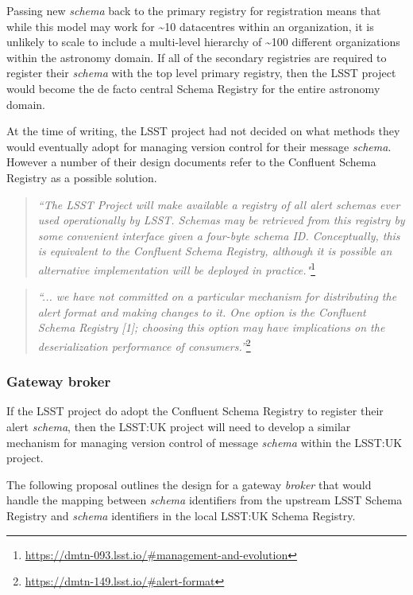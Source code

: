 \documentclass{article}
\newcommand{\datacentres} {datacentres\xspace}
\newcommand{\kfbroker} {\textit{broker}\xspace}
\newcommand{\confluent} {Confluent\xspace}
\newcommand{\avschema} {\textit{schema}\xspace}
\newcommand{\conschemareg} {registry\xspace}
\newcommand{\conschemaregistry} {Schema Registry\xspace}
\newcommand{\lsst} {LSST\xspace}
\newcommand{\lsstuk} {LSST:UK\xspace}
\newcommand{\footurl}[1] {\footnote{\url{#1}}}
\begin{document}
Passing new \avschema back to the primary \conschemareg for registration means that while this model may work for \textasciitilde 10 \datacentres within an organization, it is unlikely to scale to include a multi-level hierarchy of \textasciitilde 100 different organizations within the astronomy domain.
If all of the secondary registries are required to register their \avschema with the top level primary registry, then the \lsst project would become the de facto central \conschemaregistry for the entire astronomy domain. 

At the time of writing, the \lsst project had not decided on what methods they would eventually adopt for managing version control for their message \avschema. However a number of their design documents refer to the \confluent \conschemaregistry as a possible solution.

\begin{quote}
\textit{“The LSST Project will make available a registry of all alert schemas ever used operationally by LSST. Schemas may be retrieved from this registry by some convenient interface given a four-byte schema ID. Conceptually, this is equivalent to the Confluent Schema Registry, although it is possible an alternative implementation will be deployed in practice."}\footurl{https://dmtn-093.lsst.io/#management-and-evolution}
\end{quote}

\begin{quote}
\textit{“... we have not committed on a particular mechanism for distributing the alert format and making changes to it. One option is the Confluent Schema Registry [1]; choosing this option may have implications on the deserialization performance of consumers.”}\footurl{https://dmtn-149.lsst.io/#alert-format}
\end{quote}

\subsubsection{Gateway broker}
\label{avro-schema-gateway}

If the \lsst project do adopt the \confluent \conschemaregistry to register their alert \avschema, then the \lsstuk project will need to develop a similar mechanism for managing version control of message \avschema within the \lsstuk project.

The following proposal outlines the design for a gateway \kfbroker that would handle the mapping between \avschema identifiers from the upstream \lsst \conschemaregistry and \avschema identifiers in the local \lsstuk \conschemaregistry.
\end{document}

